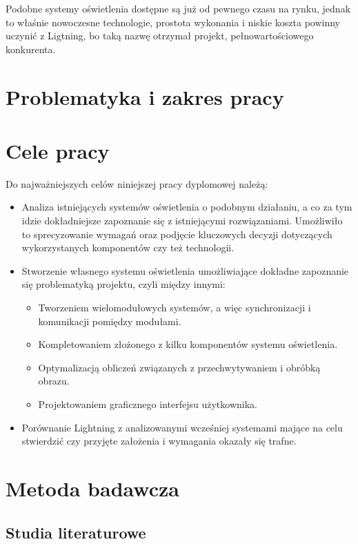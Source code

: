 \documentclass[12pt]{report}
\begin{document}
Podobne systemy oświetlenia dostępne są już od pewnego czasu na rynku, jednak to właśnie nowoczesne technologie, prostota wykonania i niskie koszta powinny uczynić z Ligtning, bo taką nazwę otrzymał projekt, pełnowartościowego konkurenta.

\section{Problematyka i zakres pracy}


\section{Cele pracy}

Do najważniejszych celów niniejszej pracy dyplomowej należą:

\begin{itemize}
	\item Analiza istniejących systemów oświetlenia o podobnym działaniu, a co za tym idzie dokładniejsze zapoznanie się z istniejącymi rozwiązaniami. Umożliwiło to sprecyzowanie wymagań oraz podjęcie kluczowych decyzji do\-tyczą\-cych wykorzystanych komponentów czy też technologii.
	\item Stworzenie własnego systemu oświetlenia umożliwiające dokładne zapoznanie się problematyką projektu, czyli między innymi:
	\begin{itemize}
		\item Tworzeniem wielomodułowych systemów, a więc synchronizacji i komunikacji pomiędzy modułami.
		\item Kompletowaniem złożonego z kilku komponentów systemu oświetlenia.
		\item Optymalizacją obliczeń związanych z przechwytywaniem i obróbką obrazu.
		\item Projektowaniem graficznego interfejsu użytkownika.
	\end{itemize}
	\item Porównanie Lightning z analizowanymi wcześniej systemami mające na celu stwierdzić czy przyjęte założenia i wymagania okazały się trafne.
\end{itemize}

\section{Metoda badawcza}

\subsection{Studia literaturowe}
\end{document}
